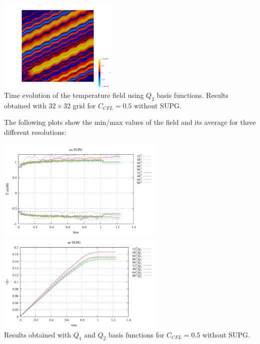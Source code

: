 \begin{center}
\includegraphics[width=5.7cm]{python_codes/fieldstone_43/results/experiment9/T.0040.png}\\
{\captionfont Time evolution of the 
temperature field using $Q_2$ basis functions. 
Results obtained with $32\times 32$ grid for $C_{CFL}=0.5$ without SUPG.}
\end{center}


The following plots show the min/max values of the field and its average for three
different resolutions:
\begin{center}
\includegraphics[width=8cm]{python_codes/fieldstone_43/results/experiment9/stats_T.pdf}
\includegraphics[width=8cm]{python_codes/fieldstone_43/results/experiment9/avrg_T.pdf}\\
{\captionfont Results obtained with $Q_1$ and $Q_2$ basis functions for $C_{CFL}=0.5$ without SUPG.}
\end{center}

